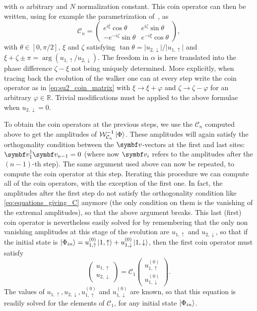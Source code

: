 with $\alpha$ arbitrary and $N$ normalization constant.
This coin operator can then be written, using for example the parametrization of~\cite{chandrashekar2008optimizing}, as
\begin{equation}
	\mathcal C_n = 
	\begin{pmatrix}
		e^{i\xi} \cos\theta &
		e^{i\zeta} \sin\theta \\
		-e^{-i\zeta}\sin\theta & e^{-i\xi}\cos\theta
	\end{pmatrix},
	\label{eq:su2_coin_matrix}
\end{equation}
with $\theta\in [0, \pi/2]$, $\xi$ and $\zeta$ satisfying
$\tan\theta = \lvert u_{2,\downarrow} \rvert/\lvert u_{1,\uparrow} \rvert$
and
$\xi + \zeta \pm \pi = \arg\left(u_{1, \uparrow}/u_{2, \downarrow}\right)$.
The freedom in $\alpha$ is here translated into the phase difference $\zeta - \xi$ not being uniquely determined.
More explicitly, when tracing back the evolution of the walker one can at every step write the coin operator as in \cref{eq:su2_coin_matrix} with $\xi \to \xi + \varphi$ and $\zeta \to \zeta - \varphi$ for an arbitrary $\varphi\in \mathbb R$.
Trivial modifications must be applied to the above formulae when $u_{2,\downarrow} = 0$.

To obtain the coin operators at the previous steps, we use the $\mathcal C_n$ computed above to get the amplitudes of $\mathcal W_{\mathcal C_n}^{-1} \ket\Phi$.
These amplitudes will again satisfy the orthogonality condition between the $\bs v$-vectors at the first and last sites:
${\bs v_1^\dagger \bs v_{n-1} = 0}$
(where now $\bs v_i$ refers to the amplitudes after the $(n-1)$-th step).
The same argument used above can now be repeated, to compute the coin operator at this step.
Iterating this procedure we can compute all of the coin operators, with the exception of the first one.
In fact, the amplitudes after the first step do not satisfy the orthogonality condition like \cref{eq:equations_giving_C} anymore (the only condition on them is the vanishing of the extremal amplitudes), so that the above argument breaks.
This last (first) coin operator is nevertheless easily solved for by remembering that the only non vanishing amplitudes at this stage of the evolution are $u_{1,\uparrow}$ and $u_{2, \downarrow}$, so that if the initial state is
${\ket{\Phi_{in}} = u^{(0)}_{1,\uparrow} \ket{1, \uparrow} + u^{(0)}_{1, \downarrow} \ket{1, \downarrow}}$, then the first coin operator must satisfy
\begin{equation}
	\begin{pmatrix}
		u_{1, \uparrow} \\ u_{2,\downarrow}
	\end{pmatrix}
	= \mathcal C_1
	\begin{pmatrix}
		u^{(0)}_{1, \uparrow} \\ u^{(0)}_{1, \downarrow}
	\end{pmatrix}.
\end{equation}
The values of $u_{1, \uparrow}, u_{2,\downarrow}, u^{(0)}_{1, \uparrow}$ and $u^{(0)}_{1, \downarrow}$ are known, so that this equation is readily solved for the elements of $\mathcal C_1$, for any initial state $\ket{\Phi_{in}}$.


